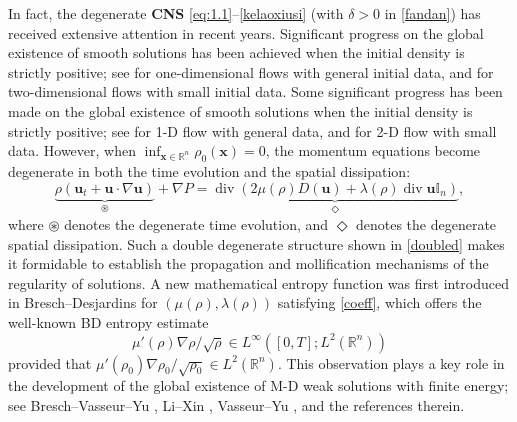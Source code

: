 \documentclass[11pt,reqno]{amsart}
\DeclareMathOperator{\diver}{\mathrm{div}}
\numberwithin{rk}{section}
\numberwithin{prop}{section}
\numberwithin{mydef}{section}
\numberwithin{lem}{section}
\numberwithin{equation}{section}
\numberwithin{thm}{section}
\begin{document}
 
In fact, the degenerate \textbf{CNS} \eqref{eq:1.1}--\eqref{kelaoxiusi} (with $\delta>0$ in \eqref{fandan})  has received extensive attention in recent years. 
Significant progress on the global existence of smooth solutions has been achieved when the initial density is strictly positive; see \cite{cons,HB,kv,vassu2} for one-dimensional flows with general initial data, and \cite{Sundbye2,weike} for two-dimensional flows with small initial data. Some significant progress has been made on the global existence of smooth solutions when the initial density is strictly positive; see \cite{cons,HB,kv,vassu2} for 1-D flow with general data, and \cite{Sundbye2,weike} for 2-D flow with small data.  
However, when  $\inf_{\boldsymbol{x}\in\mathbb{R}^n} {\rho_0(\boldsymbol{x})}=0$, the momentum equations become 
degenerate in both the 
time evolution and the spatial dissipation: 
\begin{equation}\label{doubled}
\displaystyle
 \underbrace{\rho(\boldsymbol{u}_t+\boldsymbol{u}\cdot \nabla \boldsymbol{u})}_{\circledast}+\nabla P= \underbrace{\diver(2\mu(\rho)D(\boldsymbol{u})+\lambda(\rho)\diver \boldsymbol{u} \mathbb{I}_n)}_{\Diamond},
\end{equation}
where $\circledast$ denotes the degenerate time evolution, and $\Diamond$ denotes the degenerate spatial dissipation.
Such a double degenerate structure shown in \eqref{doubled} makes it formidable to establish the propagation and mollification mechanisms of the regularity of solutions. A new mathematical entropy
function was first introduced in Bresch--Desjardins \cite{bd3}  for
 $(\mu(\rho),\lambda(\rho))$ satisfying \eqref{coeff}, which offers the well-known BD entropy estimate
\begin{equation}\label{BDentropye}
\mu'(\rho)\nabla \rho/\sqrt{\rho}\in L^\infty ([0,T];L^2(\mathbb{R}^n))
\end{equation}
provided that    $
\mu'(\rho_0)\nabla \rho_0/\sqrt{\rho_0}\in L^2(\mathbb{R}^n)$.
This observation plays a key role in the development of the global existence of M-D weak solutions with finite energy; see   Bresch--Vasseur--Yu \cite{bvy},  Li--Xin \cite{lz}, Vasseur--Yu \cite{vayu}, 
and the references therein. 
\end{document}
